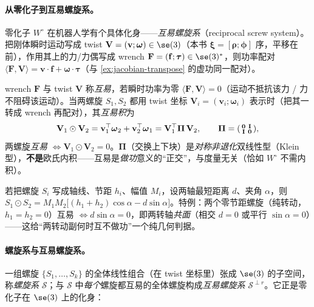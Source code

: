 \paragraph{从零化子到互易螺旋系。}
零化子 $W^\circ$ 在机器人学有个具体化身——\emph{互易螺旋系}（reciprocal screw system）。把刚体瞬时运动写成 twist $\mathbf{V}=(\mathbf{v};\boldsymbol{\omega})\in\se(3)$（本书 $\boldsymbol{\xi}=[\boldsymbol{\rho};\boldsymbol{\phi}]$ 序，平移在前），作用其上的力/力偶写成 wrench $\mathbf{F}=(\mathbf{f};\boldsymbol{\tau})\in\se(3)^*$，则功率配对 $\langle\mathbf{F},\mathbf{V}\rangle=\mathbf{v}\cdot\mathbf{f}+\boldsymbol{\omega}\cdot\boldsymbol{\tau}$（与 \cref{ex:jacobian-transpose} 的虚功同一配对）。

\begin{definition}\label{def:recip-product}
wrench $\mathbf{F}$ 与 twist $\mathbf{V}$ 称\emph{互易}，若瞬时功率为零 $\langle\mathbf{F},\mathbf{V}\rangle=0$（运动不抵抗该力 / 力不阻碍该运动）。当两螺旋 $S_1,S_2$ 都用 twist 坐标 $\mathbf{V}_i=(\mathbf{v}_i;\boldsymbol{\omega}_i)$ 表示时（把其一转成 wrench 再配对），其\emph{互易积}为
\begin{equation}
  \mathbf{V}_1\odot\mathbf{V}_2=\mathbf{v}_1^\top\boldsymbol{\omega}_2+\mathbf{v}_2^\top\boldsymbol{\omega}_1=\mathbf{V}_1^\top\boldsymbol{\Pi}\,\mathbf{V}_2,\qquad \boldsymbol{\Pi}=\begin{psmallmatrix}\mathbf{0}&\mathbf{I}\\\mathbf{I}&\mathbf{0}\end{psmallmatrix},
  \label{eq:recip-product}
\end{equation}
两螺旋\emph{互易} $\iff\mathbf{V}_1\odot\mathbf{V}_2=0$。$\boldsymbol{\Pi}$（交换上下块）是\emph{对称非退化}双线性型（Klein 型），\textbf{不是}欧氏内积——互易是\emph{做功}意义的“正交”，与度量无关（恰如 $W^\circ$ 不需内积）。
\end{definition}

\begin{note}[互易积的几何形式]\label{note:recip-geom}
若把螺旋 $S_i$ 写成轴线、节距 $h_i$、幅值 $M_i$，设两轴最短距离 $d$、夹角 $\alpha$，则 $S_1\odot S_2=M_1M_2\big[(h_1+h_2)\cos\alpha-d\sin\alpha\big]$。特例：两个零节距螺旋（纯转动，$h_1=h_2=0$）互易 $\iff d\sin\alpha=0$，即两转轴\emph{共面}（相交 $d=0$ 或平行 $\sin\alpha=0$）——这给“两转动副何时互不做功”一个纯几何判据。
\end{note}

\paragraph{螺旋系与互易螺旋系。}
一组螺旋 $\{S_1,\dots,S_k\}$ 的全体线性组合（在 twist 坐标里）张成 $\se(3)$ 的子空间，称\emph{螺旋系} $\mathcal{S}$；与 $\mathcal{S}$ 中\emph{每个}螺旋都互易的全体螺旋构成\emph{互易螺旋系} $\mathcal{S}^{\perp r}$。它正是零化子在 $\se(3)$ 上的化身：

